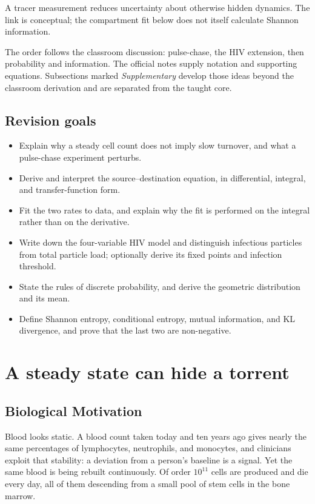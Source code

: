 A tracer measurement reduces uncertainty about otherwise hidden dynamics. The link is conceptual; the compartment fit below does not itself calculate Shannon information.

\begin{remark}
The order follows the classroom discussion: pulse-chase, the HIV extension, then probability and information. The official notes supply notation and supporting equations. Subsections marked \emph{Supplementary} develop those ideas beyond the classroom derivation and are separated from the taught core.
\end{remark}

\subsection*{Revision goals}
\begin{itemize}
\item Explain why a steady cell count does not imply slow turnover, and what a pulse-chase experiment perturbs.
\item Derive and interpret the source--destination equation, in differential, integral, and transfer-function form.
\item Fit the two rates to data, and explain why the fit is performed on the integral rather than on the derivative.
\item Write down the four-variable HIV model and distinguish infectious particles from total particle load; optionally derive its fixed points and infection threshold.
\item State the rules of discrete probability, and derive the geometric distribution and its mean.
\item Define Shannon entropy, conditional entropy, mutual information, and KL divergence, and prove that the last two are non-negative.
\end{itemize}

\section{A steady state can hide a torrent}\label{sec:lec02:steady}

\subsection*{Biological Motivation}
Blood looks static. A blood count taken today and ten years ago gives nearly the same percentages of lymphocytes, neutrophils, and monocytes, and clinicians exploit that stability: a deviation from a person's baseline is a signal. Yet the same blood is being rebuilt continuously. Of order $10^{11}$ cells are produced and die every day, all of them descending from a small pool of stem cells in the bone marrow.

